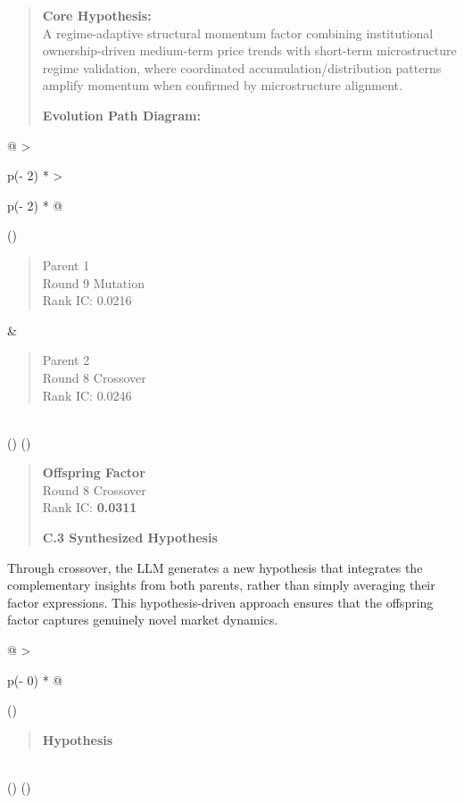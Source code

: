 \documentclass[
]{article}
\begin{document}
\begin{quote}
\textbf{Core Hypothesis:}\\
A regime-adaptive structural momentum factor combining institutional
ownership-driven medium-term price trends with short-term microstructure
regime validation, where coordinated accumulation/distribution patterns
amplify momentum when confirmed by microstructure alignment.

\textbf{Evolution Path Diagram:}
\end{quote}

\begin{longtable}[]{@{}
  >{\raggedright\arraybackslash}p{(\columnwidth - 2\tabcolsep) * }
  >{\raggedright\arraybackslash}p{(\columnwidth - 2\tabcolsep) * }@{}}
\toprule()
\begin{minipage}[b]{\linewidth}\raggedright
\begin{quote}
Parent 1\\
Round 9 Mutation\\
Rank IC: 0.0216
\end{quote}\strut
\end{minipage} & \begin{minipage}[b]{\linewidth}\raggedright
\begin{quote}
Parent 2\\
Round 8 Crossover\\
Rank IC: 0.0246
\end{quote}\strut
\end{minipage} \\
\midrule()
\endhead
\bottomrule()
\end{longtable}

\begin{quote}
\textbf{Offspring Factor}\\
Round 8 Crossover\\
Rank IC: \textbf{0.0311}

\textbf{C.3 Synthesized Hypothesis}
\end{quote}

Through crossover, the LLM generates a new hypothesis that integrates
the complementary insights from both parents, rather than simply
averaging their factor expressions. This hypothesis-driven approach
ensures that the offspring factor captures genuinely novel market
dynamics.

\begin{longtable}[]{@{}
  >{\raggedright\arraybackslash}p{(\columnwidth - 0\tabcolsep) * }@{}}
\toprule()
\begin{minipage}[b]{\linewidth}\raggedright
\begin{quote}
\textbf{Hypothesis}
\end{quote}
\end{minipage} \\
\midrule()
\endhead
\bottomrule()
\end{longtable}
\end{document}
